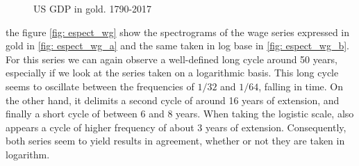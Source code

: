 \documentclass[a4paper]{article}
\begin{document}
\begin{figure}[H]
	\centering
	\caption{US GDP in gold. 1790-2017} \label{fig:espect_PBI}
\end{figure}

the figure \ref{fig: espect_wg} show the spectrograms of the wage series expressed in gold in \ref{fig: espect_wg_a} and the same taken in log base in \ref{fig: espect_wg_b}. For this series we can again observe a well-defined long cycle around 50 years, especially if we look at the series taken on a logarithmic basis. This long cycle seems to oscillate between the frequencies of $1/32$ and $1/64$, falling in time. On the other hand, it delimits a second cycle of around 16 years of extension, and finally a short cycle of between 6 and 8 years. When taking the logistic scale, also appears a cycle of higher frequency of about 3 years of extension. Consequently, both series seem to yield results in agreement, whether or not they are taken in logarithm.
\end{document}
